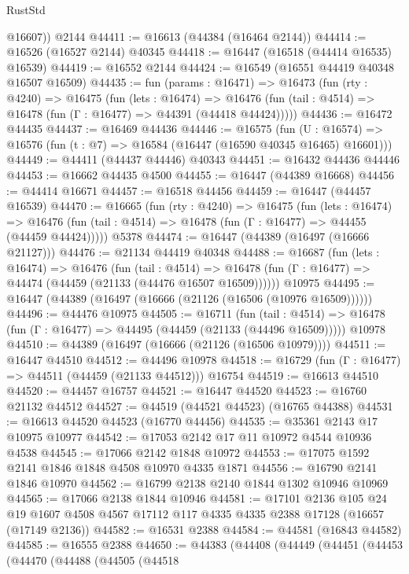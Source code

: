 \begin{lexlean}{RustStd}
\begin{coremodule}
{\begin{coremodule}
{{{{{{{{{{{{{{{{{{{{{{{{{{{{{{{{{{{{{{{{{{{{{{{{{{{{{{{        @16607))
    @2144
@44411 := @16613 (@44384 (@16464 @2144))
@44414 := @16526 (@16527 @2144) @40345
@44418 := @16447 (@16518 (@44414 @16535) @16539)
@44419 := @16552 @2144
@44424 := @16549 (@16551 @44419 @40348 @16507 @16509)
@44435 := fun (params : @16471) =>
  @16473
    (fun (rty : @4240) =>
    @16475
      (fun (lets : @16474) =>
      @16476 (fun (tail : @4514) => @16478 (fun (Γ : @16477) => @44391 (@44418 @44424)))))
@44436 := @16472 @44435
@44437 := @16469 @44436
@44446 := @16575
    (fun (U : @16574) => @16576 (fun (t : @7) => @16584 (@16447 (@16590 @40345 @16465) @16601)))
@44449 := @44411 (@44437 @44446) @40343
@44451 := @16432 @44436 @44446
@44453 := @16662 @44435 @4500
@44455 := @16447 (@44389 @16668)
@44456 := @44414 @16671
@44457 := @16518 @44456
@44459 := @16447 (@44457 @16539)
@44470 := @16665
    (fun (rty : @4240) =>
    @16475
      (fun (lets : @16474) =>
      @16476 (fun (tail : @4514) => @16478 (fun (Γ : @16477) => @44455 (@44459 @44424)))))
    @5378
@44474 := @16447 (@44389 (@16497 (@16666 @21127)))
@44476 := @21134 @44419 @40348
@44488 := @16687
    (fun (lets : @16474) =>
    @16476
      (fun (tail : @4514) =>
      @16478 (fun (Γ : @16477) => @44474 (@44459 (@21133 (@44476 @16507 @16509))))))
    @10975
@44495 := @16447 (@44389 (@16497 (@16666 (@21126 (@16506 (@10976 @16509))))))
@44496 := @44476 @10975
@44505 := @16711
    (fun (tail : @4514) => @16478 (fun (Γ : @16477) => @44495 (@44459 (@21133 (@44496 @16509)))))
    @10978
@44510 := @44389 (@16497 (@16666 (@21126 (@16506 @10979))))
@44511 := @16447 @44510
@44512 := @44496 @10978
@44518 := @16729 (fun (Γ : @16477) => @44511 (@44459 (@21133 @44512))) @16754
@44519 := @16613 @44510
@44520 := @44457 @16757
@44521 := @16447 @44520
@44523 := @16760 @21132 @44512
@44527 := @44519 (@44521 @44523) (@16765 @44388)
@44531 := @16613 @44520 @44523 (@16770 @44456)
@44535 := @35361 @2143 @17 @10975 @10977
@44542 := @17053 @2142 @17 @11 @10972 @4544 @10936 @4538
@44545 := @17066 @2142 @1848 @10972
@44553 := @17075 @1592 @2141 @1846 @1848 @4508 @10970 @4335 @1871
@44556 := @16790 @2141 @1846 @10970
@44562 := @16799 @2138 @2140 @1844 @1302 @10946 @10969
@44565 := @17066 @2138 @1844 @10946
@44581 := @17101
    @2136
    @105
    @24
    @19
    @1607
    @4508
    @4567
    @17112
    @117
    @4335
    @4335
    @2388
    @17128
    (@16657 (@17149 @2136))
@44582 := @16531 @2388
@44584 := @44581 (@16843 @44582)
@44585 := @16555 @2388
@44650 := @44383
    (@44408
      (@44449
        (@44451
          (@44453
            (@44470
              (@44488
                (@44505
                  (@44518
}}}}}}}}}}}}}}}}}}}}}}}}}}}}}}}}}}}}}}}}}}}}}}}}}}}}}}}
\end{coremodule}}
\end{coremodule}
\end{lexlean}
